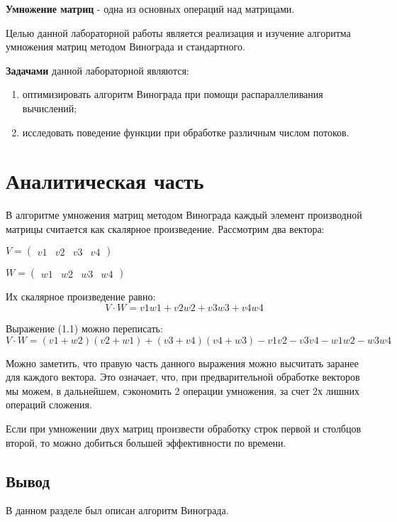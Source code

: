 \documentclass[12pt]{report}
\begin{document}
	\textbf{Умножение матриц} - одна из основных операций над матрицами.
	
	Целью данной лабораторной работы является реализация и изучение алгоритма умножения матриц методом Винограда и стандартного.
	
	\textbf{Задачами} данной лабораторной являются:
	\begin{enumerate}
		\item оптимизировать алгоритм Винограда при помощи распараллеливания вычислений;
		\item исследовать поведение функции при обработке различным числом потоков. 
	\end{enumerate}
	
	\chapter{Аналитическая часть}
	В алгоритме умножения матриц методом Винограда каждый элемент производной матрицы считается как скалярное произведение.
	Рассмотрим два вектора:
	\begin{center}
		{$
			V = 
			\begin{pmatrix}
			v1 & v2 & v3 & v4
			\end{pmatrix}
			$}
		
		{$
			W = 
			\begin{pmatrix}
			w1 & w2 & w3 & w4
			\end{pmatrix}
			$}
	\end{center}
	
	Их скалярное произведение равно:
	\begin{equation}
	V\cdot W = v1w1 + v2w2 + v3w3 + v4w4
	\end{equation}
	
	Выражение (1.1) можно переписать:
	\begin{equation}
	V\cdot W = (v1 + w2)(v2 + w1) + (v3 + v4)(v4 + w3) - v1v2 - v3v4 - w1w2 - w3w4
	\end{equation}
	
	Можно заметить, что правую часть данного выражения можно высчитать заранее для каждого вектора.
	Это означает, что, при предварительной обработке векторов мы можем, в дальнейшем, сэкономить 2 операции умножения, за счет 2х лишних операций сложения.
	
	Если при умножении двух матриц произвести обработку строк первой и столбцов второй, то можно добиться большей эффективности по времени.
	
	\section*{Вывод}
	
	В данном разделе был описан алгоритм Винограда.
	
	
\end{document}
